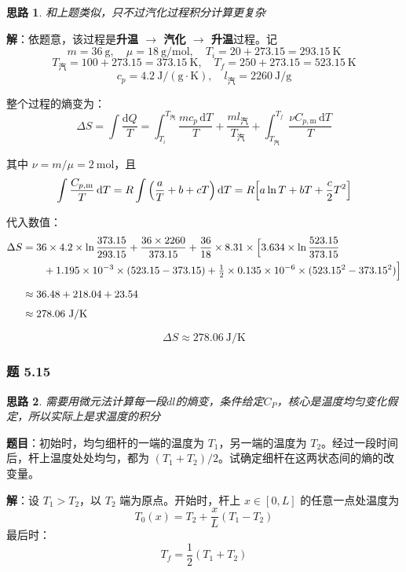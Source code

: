 \documentclass[UTF8]{ctexart}
\newtheorem{thoughts}{思路}[subsection]
\begin{document}
\begin{thoughts}
  和上题类似，只不过汽化过程积分计算更复杂
\end{thoughts}

\textbf{解}：依题意，该过程是\textbf{升温 $\to$ 汽化 $\to$ 升温}过程。记
\[
m=36\ \mathrm{g},\quad \mu=18\ \mathrm{g/mol},\quad
T_i=20+273.15=293.15\ \mathrm{K}
\]
\[
T_{\text{汽}}=100+273.15=373.15\ \mathrm{K},\quad
T_f=250+273.15=523.15\ \mathrm{K}
\]
\[
c_p=4.2\ \mathrm{J/(g\cdot K)},\quad l_{\text{汽}}=2260\ \mathrm{J/g}
\]

整个过程的熵变为：
\[
\Delta S=\int\frac{\mathrm{d}Q}{T}
=\int_{T_i}^{T_{\text{汽}}}\frac{mc_p\,\mathrm{d}T}{T}
+\frac{ml_{\text{汽}}}{T_{\text{汽}}}
+\int_{T_{\text{汽}}}^{T_f}\frac{\nu C_{p,\mathrm{m}}\,\mathrm{d}T}{T}
\]

其中 $\nu=m/\mu=2\ \mathrm{mol}$，且
\[
\int\frac{C_{p,\mathrm{m}}}{T}\,\mathrm{d}T
=R\int\left(\frac{a}{T}+b+cT\right)\mathrm{d}T
=R\Bigl[a\ln T+bT+\frac{c}{2}T^2\Bigr]
\]

代入数值：
\begin{align*}
\Delta S&=36\times 4.2\times\ln\frac{373.15}{293.15}
+\frac{36\times 2260}{373.15}
+\frac{36}{18}\times 8.31\times\Bigl[3.634\times\ln\frac{523.15}{373.15}\\
&\qquad+1.195\times 10^{-3}\times(523.15-373.15)
+\tfrac{1}{2}\times 0.135\times 10^{-6}\times(523.15^2-373.15^2)\Bigr]\\[4pt]
&\approx 36.48+218.04+23.54\\[4pt]
&\approx 278.06\ \mathrm{J/K}
\end{align*}

\[
\boxed{\Delta S\approx 278.06\ \mathrm{J/K}}
\]

\subsubsection{题 5.15}

\begin{thoughts}
  需要用微元法计算每一段$dl$的熵变，条件给定$C_P$，核心是温度均匀变化假定，所以实际上是求温度的积分
\end{thoughts}

\textbf{题目}：初始时，均匀细杆的一端的温度为 $T_1$，另一端的温度为 $T_2$。经过一段时间后，杆上温度处处均匀，都为 $(T_1+T_2)/2$。试确定细杆在这两状态间的熵的改变量。

\textbf{解}：设 $T_1>T_2$，以 $T_2$ 端为原点。开始时，杆上 $x\in[0,L]$ 的任意一点处温度为
\[
T_0(x)=T_2+\frac{x}{L}(T_1-T_2)
\]
最后时：
\[
T_f=\frac{1}{2}(T_1+T_2)
\]
\end{document}
